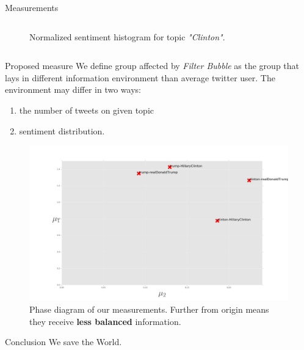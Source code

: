 \documentclass{beamer}
\begin{document}
\begin{frame}[fragile]
\begin{columns}[T]
\begin{column}{.63\textwidth}
\begin{block}{Measurements}
\begin{columns}
\begin{figure}
                \caption*{Normalized sentiment histogram for topic \textit{"Clinton"}.}
            \end{figure}
    \end{columns}
\end{block}
\begin{block}{Proposed measure}
    We define group affected by \textit{Filter Bubble} as the group that lays in different information environment than average twitter user. The environment may differ in two ways:
    \begin{enumerate}
        \item the number of tweets on given topic
        \item sentiment distribution.
    \end{enumerate}
    \begin{figure}
        \centering
        \captionsetup{justification=centering,margin=5cm}
        \includegraphics[scale=0.585]{./Pics/metric-L2-1Q.png}
        \caption*{Phase diagram of our measurements. Further from origin means they receive \textbf{less balanced} information.}
    \end{figure}
\end{block}






\begin{customalertblock}{Conclusion}
    We save the World.
\end{customalertblock}
\end{column}
\end{columns}
\end{frame}
\end{document}
